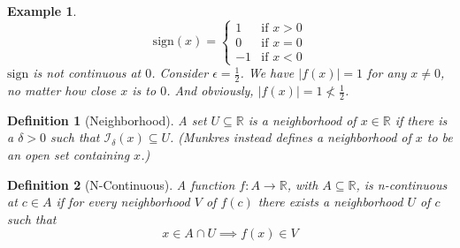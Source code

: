 \documentclass{article}
\newtheorem{definition}{Definition}%
\newtheorem{example}{Example}%
\newcommand{\Reals}[0]{\mathbb{R}}
\begin{document}
\begin{example}
\[
   \mathrm{sign}(x) = 
   \begin{cases}
     1 & \text{if } x > 0 \\
     0 & \text{if } x = 0 \\
     -1 & \text{if } x < 0 
   \end{cases}
\]
$\mathrm{sign}$ is not continuous at $0$. Consider $\epsilon = \frac{1}{2}$.
We have $|f(x)| = 1$ for any $x \neq 0$, no matter how close $x$ is to
$0$. And obviously, $|f(x)| = 1 \not < \frac{1}{2}$.
\end{example}


\begin{definition}[Neighborhood]
  A set $U \subseteq \Reals$ is a neighborhood of $x \in \Reals$
  if there is a $\delta > 0$ such that $\mathcal{I}_\delta(x) \subseteq U$.
  (Munkres instead defines a neighborhood of $x$ to be
   an open set containing $x$.)
\end{definition}


\begin{definition}[N-Continuous]
  A function $f : A \to \Reals$, with $A \subseteq \Reals$,
  is n-continuous at $c \in A$ if for every neighborhood
  $V$ of $f(c)$ there exists a neighborhood $U$ of $c$
  such that
  \[
    x \in A \cap U \implies f(x) \in V
  \]
\end{definition}
\end{document}
